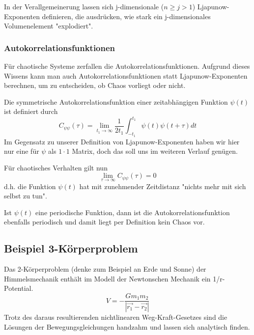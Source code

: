 \documentclass[12pt]{book}
\begin{document}
In der Verallgemeinerung lassen sich j-dimensionale ($n \geq j > 1$) Ljapunow-Exponenten definieren, die ausdrücken, wie stark ein j-dimensionales Volumenelement "explodiert". 

\subsubsection{Autokorrelationsfunktionen}

Für chaotische Systeme zerfallen die Autokorrelationsfunktionen. Aufgrund dieses Wissens kann man auch Autokorrelationsfunktionen statt Ljapunow-Exponenten berechnen, um zu entscheiden, ob Chaos vorliegt oder nicht. 

Die symmetrische Autokorrelationsfunktion einer zeitabhängigen Funktion $\psi(t)$ ist definiert durch
\begin{equation} 
C_{{\psi\psi}}(\tau )=\lim_{t_1 \to \infty}{\frac  {1}{2t_1}}\int _{-t_1}^{t_1}\psi(t)\psi(t+\tau)dt
\label{eq:auto_correlation}
\end{equation}
Im Gegensatz zu unserer Definition von Ljapunow-Exponenten haben wir hier nur eine für $\psi$ als $1 \cdot 1$ Matrix, doch das soll uns im weiteren Verlauf genügen.

Für chaotisches Verhalten gilt nun
\begin{equation} 
\lim_{\tau \to \infty} C_{{\psi\psi}}(\tau ) = 0
\end{equation}
d.h. die Funktion $\psi(t)$ hat mit zunehmender Zeitdistanz "nichts mehr mit sich selbst zu tun".

Ist $\psi(t)$ eine periodische Funktion, dann ist die Autokorrelationsfunktion ebenfalls periodisch und damit liegt per Definition kein Chaos vor.

\subsection{Beispiel 3-Körperproblem}

Das 2-Körperproblem (denke zum Beispiel an Erde und Sonne) der Himmelsmechanik enthält im Modell der Newtonschen Mechanik ein 1/r-Potential.
\begin{equation*}
V = - \frac{G m_1 m_2}{|\vec{r_1} - \vec{r_2}|}
\end{equation*}
Trotz des daraus resultierenden nichtlinearen Weg-Kraft-Gesetzes sind die Lösungen der Bewegungsgleichungen handzahm und lassen sich analytisch finden.
\end{document}
